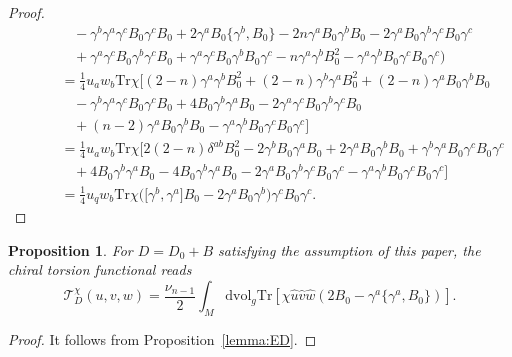 \documentclass[pdftex]{sigma}
\numberwithin{equation}{section}
\newtheorem{Proposition}[Theorem]{Proposition}
\theoremstyle{definition}
\def\Tr{\mathrm{Tr}}
\def\dv{\mathrm{dvol}_g}
\begin{document}
\begin{proof}
\begin{gather*}
\phantom{\qquad+=}{}	-\gamma^b \gamma^a \gamma^c B_0 \gamma^c B_0+2\gamma^a B_0 \bigl\{\gamma^b, B_0\bigr\}-2n \gamma^a B_0 \gamma^b B_0 -2\gamma^a B_0 \gamma^b \gamma^c B_0 \gamma^c \\
\phantom{\qquad+=}{}+\gamma^a \gamma^c B_0 \gamma^b \gamma^c B_0+\gamma^a \gamma^c B_0 \gamma^b B_0 \gamma^c - n\gamma^a \gamma^b B_0^2 -\gamma^a\gamma^b B_0 \gamma^c B_0 \gamma^c\bigr)\\
\phantom{\qquad+}{} =\frac{1}{4}u_aw_b \Tr \chi\bigl[
 (2-n)\gamma^a\gamma^b B_0^2 +(2-n)\gamma^b\gamma^a B_0^2 +(2-n) \gamma^a B_0\gamma^b B_0 \\
\phantom{\qquad+=}{}-\gamma^b\gamma^a \gamma^c B_0 \gamma^c B_0+4B_0 \gamma^b \gamma^a B_0-2\gamma^a\gamma^c B_0\gamma^b \gamma^c B_0 \\
\phantom{\qquad+=}{}+(n-2)\gamma^a B_0 \gamma^b B_0 - \gamma^a \gamma^b B_0 \gamma^c B_0 \gamma^c
 \bigr]\\
 \phantom{\qquad+}{}=\frac{1}{4}u_a w_b \Tr \chi\bigl[
2(2-n) \delta^{ab}B_0^2 -2\gamma^b B_0 \gamma^a B_0 +2\gamma^a B_0 \gamma^b B_0 +\gamma^b \gamma^a B_0 \gamma^c B_0 \gamma^c \\
\phantom{\qquad+=}{} + 4 B_0 \gamma^b \gamma^a B_0-4 B_0 \gamma^b \gamma^a B_0 -2\gamma^a B_0 \gamma^b \gamma^c B_0 \gamma^c
 -\gamma^a \gamma^b B_0 \gamma^c B_0 \gamma^c\bigr]\\
 \phantom{\qquad+}{}=\frac{1}{4}u_q w_b \Tr \chi \bigl(\bigl[\gamma^b,\gamma^a\bigr]B_0 - 2\gamma^a B_0 \gamma^b\bigr) \gamma^c B_0 \gamma^c.	\tag*{\qed}
 \end{gather*} \renewcommand{\qed}{}
\end{proof}

\begin{Proposition}
	\label{prop:torchi}
 For $D = D_0+B$ satisfying the assumption of this paper, the chiral torsion functional reads
 \[
 \mathscr{T}^\chi_D(u,v,w)=\frac{\nu_{n-1}}{2}\int_M \dv \Tr\left[\chi\hat{u}\hat{v}\hat{w}(2B_0-\gamma^a\{\gamma^a,B_0\})\right].
 \]
\end{Proposition}
\begin{proof}
 It follows from Proposition~\ref{lemma:ED}.
\end{proof}
\end{document}
